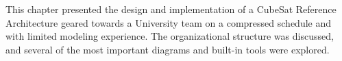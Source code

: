 
This chapter presented the design and implementation of a CubeSat Reference Architecture geared towards a University team on a compressed schedule and with limited modeling experience. The organizational structure was discussed, and several of the most important diagrams and built-in tools were explored. 